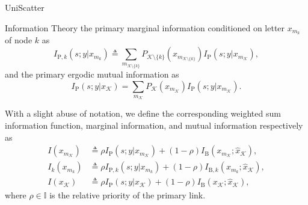 \documentclass[journal]{IEEEtran}
\begin{document}
\begin{section}{UniScatter}
\begin{subsection}{Information Theory}
		the primary marginal information conditioned on letter $x_{m_k}$ of node $k$ as
		\begin{equation}
			I_{\mathrm{P},k}(s;y|x_{m_k}) \triangleq \sum_{m_{\mathcal{K} \setminus \{k\}}} P_{\mathcal{K} \setminus \{k\}}(x_{m_{\mathcal{K} \setminus \{k\}}}) I_{\mathrm{P}}(s;y|x_{m_{\mathcal{K}}}),
			\label{eq:primary_marginal_information}
		\end{equation}
		and the primary ergodic mutual information as
		\begin{equation}
			I_{\mathrm{P}}(s;y|x_{\mathcal{K}}) = \sum_{m_{\mathcal{K}}} P_{\mathcal{K}}(x_{m_{\mathcal{K}}}) I_{\mathrm{P}}(s;y|x_{m_{\mathcal{K}}}).
			\label{eq:primary_mutual_information}
		\end{equation}

		With a slight abuse of notation, we define the corresponding weighted sum information function, marginal information, and mutual information respectively as
		\begin{align}
			I(x_{m_{\mathcal{K}}})
			 & \triangleq \rho I_{\mathrm{P}}(s;y|x_{m_{\mathcal{K}}}) + (1 - \rho) I_{\mathrm{B}}(x_{m_{\mathcal{K}}};\hat{x}_{\mathcal{K}}),\label{eq:weighted_sum_information_function} \\
			I_k(x_{m_k})
			 & \triangleq \rho I_{\mathrm{P},k}(s;y|x_{m_k}) + (1 - \rho) I_{\mathrm{B},k}(x_{m_k};\hat{x}_{\mathcal{K}}),\label{eq:weighted_sum_marginal_information}                     \\
			I(x_{\mathcal{K}})
			 & \triangleq \rho I_{\mathrm{P}}(s;y|x_{\mathcal{K}}) + (1 - \rho) I_{\mathrm{B}}(x_{\mathcal{K}};\hat{x}_{\mathcal{K}}),\label{eq:weighted_sum_mutual_information}
		\end{align}
		where $\rho \in \mathbb{I}$ is the relative priority of the primary link.
	\end{subsection}
	\label{se:uniscatter}
\end{section}
\end{document}
